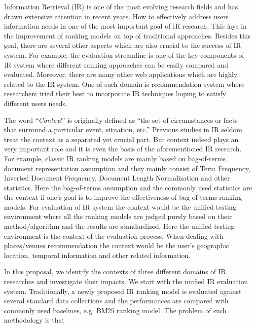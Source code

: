 %
%
Information Retrieval (IR) is one of the most evolving research fields 
and has drawn extensive attention in recent years. 
How to effectively address users information needs in one of the most 
important goal of IR research. This lays in the improvement of ranking 
models on top of traditional approaches. Besides this goal, there 
are several other aspects which are also crucial to the success of IR 
system. For example, the evaluation streamline is one of the key 
components of IR system where different ranking approaches can be 
easily compared and evaluated. 
Moreover, there are many other web applications which 
are highly related to the IR system. One of such domain is recommendation 
system where researchers tried their best to incorporate IR techniques 
hoping to satisfy different users needs.

The word ``\textit{Context}'' is originally defined as ``the set of circumstances or facts that surround a particular event, situation, etc.'' 
Previous studies in IR seldom treat the context as a separated yet 
crucial part. But context indeed plays an very important role and it 
is even the basis of the aforementioned IR research.
For example, classic IR ranking models are mainly based on 
bag-of-terms document representation assumption and they mainly 
consist of Term Frequency, Inverted Document Frequency, Document Length 
Normalization and other statistics. Here the bag-of-terms assumption 
and the commonly used statistics are the context if one's goal is to 
improve the effectiveness of bag-of-terms ranking models. 
For evaluation of IR system the context would be the unified testing 
environment where all the ranking models are judged purely based on 
their method/algorithm and the results are standardized. Here the unified 
testing environment is the context of the evaluation process. 
When dealing with places/venues recommendation the context would be the 
user's geographic location, temporal information and other related 
information. 

In this proposal, we identify the contexts of three different domains 
of IR researches and investigate their impacts. We start with the 
unified IR evaluation system. Traditionally, a newly proposed IR 
ranking model is evaluated against several standard data collections 
and the performances are compared with commonly used baselines, e.g. 
BM25 ranking model. The problem of such methodology is that 

